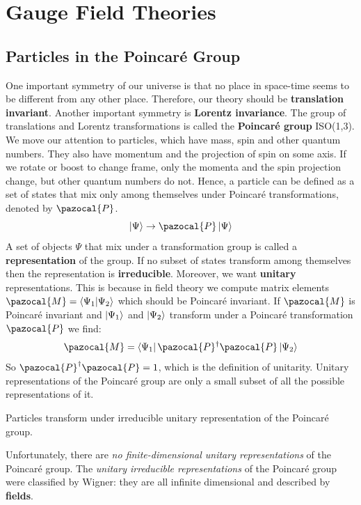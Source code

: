 \documentclass[../main.tex]{subfiles}
\begin{document}
\setchapterpreamble[u]{\margintoc}
\chapter[Gauge Field Theories]{Gauge Field Theories\footnotemark[0]}
\section{Particles in the Poincaré Group}
One important symmetry of our universe is that no place in space-time seems to be different from any other place. Therefore, our theory should be \textbf{translation invariant}. Another important symmetry is \textbf{Lorentz invariance}. The group of translations and Lorentz transformations is called the \textbf{Poincaré group} ISO(1,3).\\
We move our attention to particles, which have mass, spin and other quantum numbers. They also have momentum and the projection of spin on some axis. If we rotate or boost to change frame, only the momenta and the spin projection change, but other quantum numbers do not. Hence, a particle can be defined as a set of states that mix only among themselves under Poincaré transformations, denoted by $\pazocal{P}$.
\[
\ket{\Psi}\to\pazocal{P}\ket{\Psi}
\]
A set of objects $\Psi$ that mix under a transformation group is called a \textbf{representation} of the group. If no subset of states transform among themselves then the representation is \textbf{irreducible}. Moreover, we want \textbf{unitary} representations. This is because in field theory we compute matrix elements $\pazocal{M}=\bra{\Psi_1}\ket{\Psi_2}$ which should be Poincaré invariant. If $\pazocal{M}$ is Poincaré invariant and $\ket{\Psi_1}$ and $\ket{\Psi_2}$ transform under a Poincaré transformation $\pazocal{P}$ we find:
\[
\pazocal{M}=\bra{\Psi_1}\pazocal{P}^\dagger\pazocal{P}\ket{\Psi_2}
\]
So $\pazocal{P}^\dagger\pazocal{P}=1$, which is the definition of unitarity. Unitary representations of the Poincaré group are only a small subset of all the possible representations of it. 
\begin{definition}
Particles transform under irreducible unitary representation of the Poincaré group.
\end{definition}
Unfortunately, there are \textit{no finite-dimensional unitary representations} of the Poincaré group. The \textit{unitary irreducible representations} of the Poincaré group were classified by Wigner: they are all infinite dimensional and described by \textbf{fields}.
\end{document}
